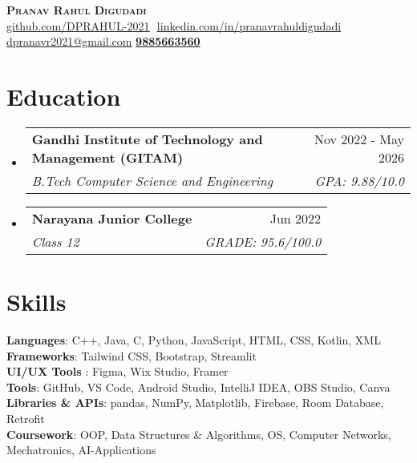\documentclass[10pt]{article}
\makeatletter
\newcommand{\resumeSubheading}[4]{
  \vspace{-2pt}\item
    \begin{tabular*}{0.97\textwidth}[t]{l@{\extracolsep{\fill}}r}
      \textbf{#1} & #2 \\
      \textit{\small#3} & \textit{\small #4} \\
    \end{tabular*}\vspace{-7pt}
}
\newcommand{\resumeSubHeadingListStart}{\begin{itemize}[leftmargin=0.15in, label={}]}
\newcommand{\resumeSubHeadingListEnd}{\end{itemize}}
\makeatother
\begin{document}
\begin{flushright}
  \color{gray}
  \item
\end{flushright}

\vspace{-5pt}

\begin{center}
    \textbf{\Huge \scshape Pranav Rahul Digudadi} \\ \vspace{8pt}
    \small 
    \href{https://github.com/DPRAHUL-2021}{\underline{github.com/DPRAHUL-2021}} $  $
    \href{https://www.linkedin.com/in/pranavrahuldigudadi/}{\underline{linkedin.com/in/pranavrahuldigudadi}} $  $
    \href{mailto:dpranavr2021@gmail.com}
    {\underline{dpranavr2021@gmail.com}}
    \textbf{\underline{9885663560}} 


\end{center}

\section{Education}
\resumeSubHeadingListStart
  
  \resumeSubheading
    {Gandhi Institute of Technology and Management (GITAM)}{Nov 2022 - May 2026}
    {B.Tech Computer Science and Engineering}{GPA: 9.88/10.0}
  \resumeSubheading
    {Narayana Junior College}{Jun 2022}
    {Class 12}{GRADE: 95.6/100.0}

\resumeSubHeadingListEnd

\section{Skills}
 \begin{itemize}[leftmargin=0.15in, label={}]
    \small{\item{
     \textbf{Languages}{: C++, Java, C, Python, JavaScript, HTML, CSS, Kotlin, XML} \\
     \textbf{Frameworks}{: Tailwind CSS, Bootstrap, Streamlit} \\    
     \textbf{UI/UX Tools }{: Figma, Wix Studio, Framer} \\   
     \textbf{Tools}{: GitHub, VS Code, Android Studio, IntelliJ IDEA, OBS Studio, Canva} \\
     \textbf{Libraries \& APIs}{: pandas, NumPy, Matplotlib, Firebase, Room Database, Retrofit} \\
     \textbf{Coursework}{: OOP, Data Structures \& Algorithms, OS, Computer Networks, Mechatronics, AI-Applications}
    }}
 \end{itemize}
\end{document}
